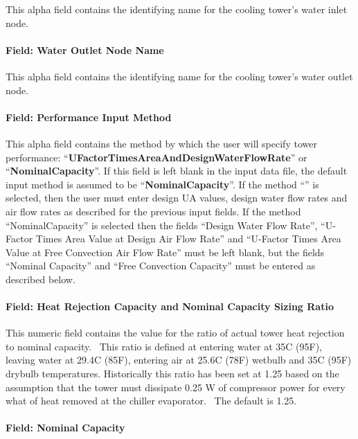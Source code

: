 This alpha field contains the identifying name for the cooling tower's water inlet node.

\paragraph{Field: Water Outlet Node Name}\label{field-water-outlet-node-name-2}

This alpha field contains the identifying name for the cooling tower's water outlet node.

\paragraph{Field: Performance Input Method}\label{field-performance-input-method-2}

This alpha field contains the method by which the user will specify tower performance: ``\textbf{UFactorTimesAreaAndDesignWaterFlowRate}'' or ``\textbf{NominalCapacity}''. If this field is left blank in the input data file, the default input method is assumed to be ``\textbf{NominalCapacity}''. If the method ``'' is selected, then the user must enter design UA values, design water flow rates and air flow rates as described for the previous input fields. If the method ``NominalCapacity'' is selected then the fields ``Design Water Flow Rate'', ``U-Factor Times Area Value at Design Air Flow Rate'' and ``U-Factor Times Area Value at Free Convection Air Flow Rate'' must be left blank, but the fields ``Nominal Capacity'' and ``Free Convection Capacity'' must be entered as described below.

\paragraph{Field: Heat Rejection Capacity and Nominal Capacity Sizing Ratio}\label{field-heat-rejection-capacity-and-nominal-capacity-sizing-ratio-2}

This numeric field contains the value for the ratio of actual tower heat rejection to nominal capacity.~ This ratio is defined at entering water at 35C (95F), leaving water at 29.4C (85F), entering air at 25.6C (78F) wetbulb and 35C (95F) drybulb temperatures. Historically this ratio has been set at 1.25 based on the assumption that the tower must dissipate 0.25 W of compressor power for every what of heat removed at the chiller evaporator.~ The default is 1.25.

\paragraph{Field: Nominal Capacity}\label{field-nominal-capacity-1}

